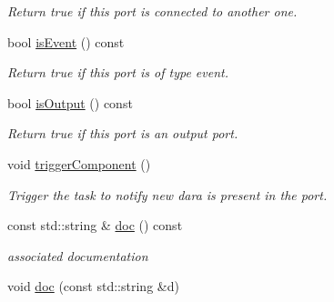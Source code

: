 \begin{DoxyCompactItemize}
\begin{DoxyCompactList}\small\item\em Return true if this port is connected to another one. \end{DoxyCompactList}\item 
\hypertarget{classcoco_1_1_port_base_a161986c4e70cdbc6df2664aafb197e0c}{}bool \hyperlink{classcoco_1_1_port_base_a161986c4e70cdbc6df2664aafb197e0c}{is\+Event} () const \label{classcoco_1_1_port_base_a161986c4e70cdbc6df2664aafb197e0c}

\begin{DoxyCompactList}\small\item\em Return true if this port is of type event. \end{DoxyCompactList}\item 
\hypertarget{classcoco_1_1_port_base_a8aed63e197daab4129a50dee5bf728fc}{}bool \hyperlink{classcoco_1_1_port_base_a8aed63e197daab4129a50dee5bf728fc}{is\+Output} () const \label{classcoco_1_1_port_base_a8aed63e197daab4129a50dee5bf728fc}

\begin{DoxyCompactList}\small\item\em Return true if this port is an output port. \end{DoxyCompactList}\item 
\hypertarget{classcoco_1_1_port_base_a8de69f58ac8d4110b51cba2616dc0ebc}{}void \hyperlink{classcoco_1_1_port_base_a8de69f58ac8d4110b51cba2616dc0ebc}{trigger\+Component} ()\label{classcoco_1_1_port_base_a8de69f58ac8d4110b51cba2616dc0ebc}

\begin{DoxyCompactList}\small\item\em Trigger the task to notify new dara is present in the port. \end{DoxyCompactList}\item 
\hypertarget{classcoco_1_1_port_base_a71bb264f74c371d2f988de9b383c8a1e}{}const std\+::string \& \hyperlink{classcoco_1_1_port_base_a71bb264f74c371d2f988de9b383c8a1e}{doc} () const \label{classcoco_1_1_port_base_a71bb264f74c371d2f988de9b383c8a1e}

\begin{DoxyCompactList}\small\item\em associated documentation \end{DoxyCompactList}\item 
\hypertarget{classcoco_1_1_port_base_ae79cc93c196c650ddef9fd14f6ba5c80}{}void \hyperlink{classcoco_1_1_port_base_ae79cc93c196c650ddef9fd14f6ba5c80}{doc} (const std\+::string \&d)\label{classcoco_1_1_port_base_ae79cc93c196c650ddef9fd14f6ba5c80}


\end{DoxyCompactItemize}
